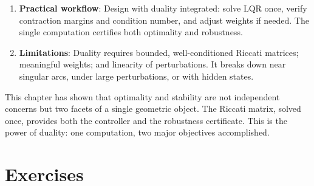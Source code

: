\begin{enumerate}
\item \textbf{Practical workflow}: Design with duality integrated: solve LQR once, verify contraction margins and condition
      number, and adjust weights if needed. The single computation certifies both optimality and robustness.

\item \textbf{Limitations}: Duality requires bounded, well-conditioned Riccati matrices; meaningful weights; and linearity
      of perturbations. It breaks down near singular arcs, under large perturbations, or with hidden states.
\end{enumerate}

This chapter has shown that optimality and stability are not independent concerns but two facets of a single geometric
object. The Riccati matrix, solved once, provides both the controller and the robustness certificate. This is the power
of duality: one computation, two major objectives accomplished.

\section*{Exercises}

